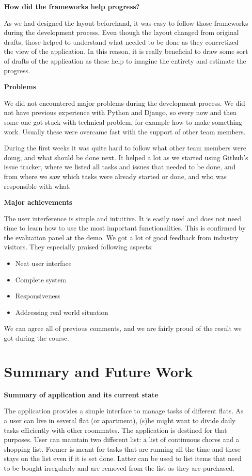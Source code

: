\documentclass{sig-alt-release2}
\begin{document}
\textbf{How did the frameworks help progress?}

As we had designed the layout beforehand, it was easy to follow those frameworks during the development process. Even though the layout changed from original drafts, those helped to understand what needed to be done as they concretized the view of the application. In this reason, it is really beneficial to draw some sort of drafts of the application as these help to imagine the entirety and estimate the progress.

\textbf{Problems}

We did not encountered major problems during the development process. We did not have previous experience with Python and Django, so every now and then some one got stuck with technical problem, for example how to make something work. Usually these were overcame fast with the support of other team members.

During the first weeks it was quite hard to follow what other team members were doing, and what should be done next. It helped a lot as we started using Github{’}s issue tracker, where we listed all tasks and issues that needed to be done, and from where we saw which tasks were already started or done, and who was responsible with what.

\textbf{Major achievements}
 
The user interference is simple and intuitive. It is easily used and does not need time to learn how to use the most important functionalities. This is confirmed by the evaluation panel at the demo. We got a lot of good feedback from industry visitors. They especially praised following aspects:
\begin{itemize}
\item Neat user interface
\item Complete system
\item Responsiveness
\item Addressing real world situation
\end{itemize}
We can agree all of previous comments, and we are fairly proud of the result we got during the course.

\section{Summary and Future Work}

\textbf{Summary of application and its current state}

The application provides a simple interface to manage tasks of different flats. As a user can live in several flat (or apartment), (s)he might want to divide daily tasks efficiently with other roommates. The application is destined for that purposes. User can maintain two different list: a list of continuous chores and a shopping list. Former is meant for tasks that are running all the time and these stays on the list even if it is set done. Latter can be used to list items that need to be bought irregularly and are removed from the list as they are purchased.
\end{document}
